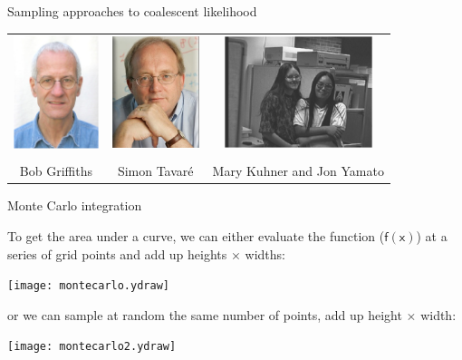 \documentclass[bluish,slideColor,colorBG,pdf]{prosper}
\begin{document}
\begin{slide}[Replace]{Sampling approaches to coalescent likelihood}
\bigskip

\begin{center}
\begin{tabular}{c c c}
\includegraphics[height=1.3in]{griffiths2.ps} &
\includegraphics[height=1.3in]{tavare.ps} &
\includegraphics[height=1.3in]{mary_and_jon.ps} \\
& & \\
Bob Griffiths & Simon Tavar\'e & Mary Kuhner and Jon Yamato
\end{tabular}
\end{center}

\end{slide}

\begin{slide}[Replace]{Monte Carlo integration}

To get the area under a curve, we can either evaluate the function
($\mathsf{f(x)}$) at a series of grid points and add up heights $\mathsf{\times}$ widths:

\centerline{\texttt{[image: montecarlo.ydraw]}}

or we can sample at random the same number of points, add up height $\times$
width:

\centerline{\texttt{[image: montecarlo2.ydraw]}}

\end{slide}
\end{document}
